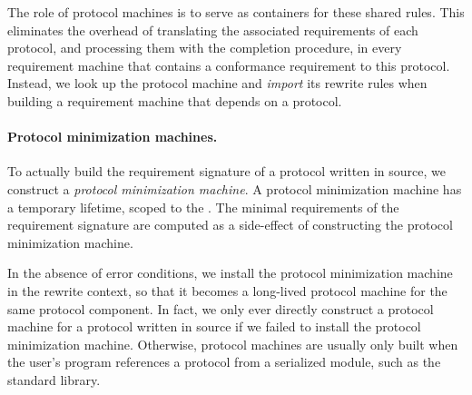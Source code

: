 \documentclass[../generics]{subfiles}
\begin{document}
The role of protocol machines is to serve as containers for these shared rules. This eliminates the overhead of translating the associated requirements of each protocol, and processing them with the completion procedure, in every requirement machine that contains a conformance requirement to this protocol. Instead, we look up the protocol machine and \emph{import} its rewrite rules when building a requirement machine that depends on a protocol.

\paragraph{Protocol minimization machines.}
To actually build the requirement signature of a protocol written in source, we construct a \emph{protocol minimization machine}. A protocol minimization machine has a temporary lifetime, scoped to the . The minimal requirements of the requirement signature are computed as a side-effect of constructing the protocol minimization machine.

In the absence of error conditions, we install the protocol minimization machine in the rewrite context, so that it becomes a long-lived protocol machine for the same protocol component. In fact, we only ever directly construct a protocol machine for a protocol written in source if we failed to install the protocol minimization machine. Otherwise, protocol machines are usually only built when the user's program references a protocol from a serialized module, such as the standard library.
\end{document}
